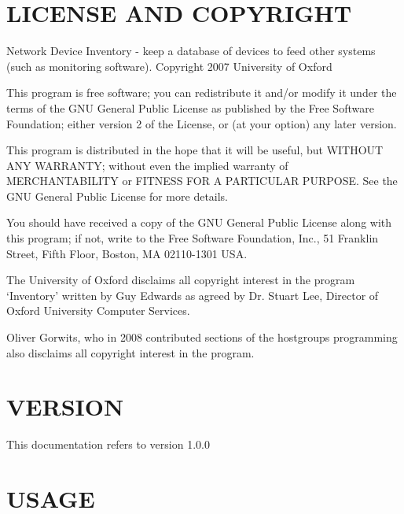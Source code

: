 \documentclass{book}
\begin{document}
\section{LICENSE AND COPYRIGHT}
\label{_LICENSE_AND_COPYRIGHT}
\hypertarget{_LICENSE_AND_COPYRIGHT}{}



Network Device Inventory - keep a database of devices to feed other systems (such as monitoring software). Copyright 2007 University of Oxford



This program is free software; you can redistribute it and/or modify it under the terms of the GNU General Public License as published by the Free Software Foundation; either version 2 of the License, or (at your option) any later version.



This program is distributed in the hope that it will be useful, but WITHOUT ANY WARRANTY; without even the implied warranty of MERCHANTABILITY or FITNESS FOR A PARTICULAR PURPOSE. See the GNU General Public License for more details.



You should have received a copy of the GNU General Public License along with this program; if not, write to the Free Software Foundation, Inc., 51 Franklin Street, Fifth Floor, Boston, MA 02110-1301 USA.



The University of Oxford disclaims all copyright interest in the program `Inventory' written by Guy Edwards as agreed by Dr. Stuart Lee, Director of Oxford University Computer Services.



Oliver Gorwits, who in 2008 contributed sections of the hostgroups programming also disclaims all copyright interest in the program.




\section{VERSION}
\label{_VERSION}
\hypertarget{_VERSION}{}



This documentation refers to version 1.0.0


\section{USAGE}
\label{_USAGE}
\hypertarget{_USAGE}{}
\end{document}
